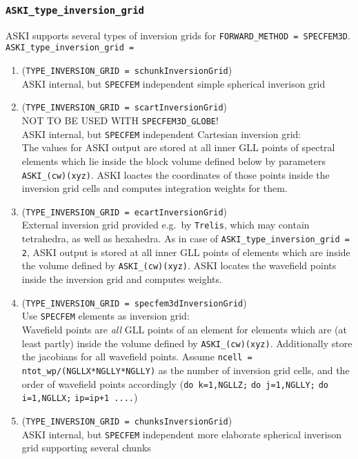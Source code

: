 \documentclass[12pt,a4paper]{article}
\newcommand{\lcode}[1]{\nolinkurl{#1}}
\newcommand{\ASKI}{ {\ttfamily ASKI} }
\begin{document}
\subsubsection*{\lcode{ASKI_type_inversion_grid}}
ASKI supports several types of inversion grids for \lcode{FORWARD_METHOD = SPECFEM3D}.
\lcode{ASKI_type_inversion_grid = }
\begin{enumerate}
\item (\lcode{TYPE_INVERSION_GRID = schunkInversionGrid}) \\ 
  \ASKI internal, but \lcode{SPECFEM} independent simple spherical inverison grid
\item (\lcode{TYPE_INVERSION_GRID = scartInversionGrid})\\
  NOT TO BE USED WITH \lcode{SPECFEM3D_GLOBE}!\\
  \ASKI internal, but \lcode{SPECFEM} independent Cartesian inversion grid:\\
  The values for \ASKI output are stored at all inner GLL points of spectral elements which lie
  inside the block volume defined below by parameters \lcode{ASKI_(cw)(xyz)}.
  \ASKI loactes the coordinates of those points inside the inversion grid cells and computes
  integration weights for them.
\item (\lcode{TYPE_INVERSION_GRID = ecartInversionGrid}) \\
  External inversion grid provided e.g.\ by \lcode{Trelis}, which may contain tetrahedra, as well as hexahedra.
  As in case of \lcode{ASKI_type_inversion_grid = 2}, \ASKI output is stored at all inner GLL points of elements
  which are inside the volume defined by \lcode{ASKI_(cw)(xyz)}.
  \ASKI locates the wavefield points inside the inversion grid and computes weights.
\item (\lcode{TYPE_INVERSION_GRID = specfem3dInversionGrid}) \\
  Use \lcode{SPECFEM} elements as inversion grid:\\
  Wavefield points are \emph{all} GLL points of an element for elements which are (at least partly) inside the 
  volume defined by \lcode{ASKI_(cw)(xyz)}. Additionally store the jacobians for all wavefield points.
  Assume \lcode{ncell = ntot_wp/(NGLLX*NGLLY*NGLLY)} as the number of inversion grid cells, and the order of 
  wavefield points accordingly (\lcode{do k=1,NGLLZ;} \lcode{do j=1,NGLLY;} \lcode{do i=1,NGLLX;} \lcode{ip=ip+1 ....})
\item (\lcode{TYPE_INVERSION_GRID = chunksInversionGrid}) \\ 
  \ASKI internal, but \lcode{SPECFEM} independent more elaborate spherical inverison grid supporting several chunks
\end{enumerate}
\end{document}
